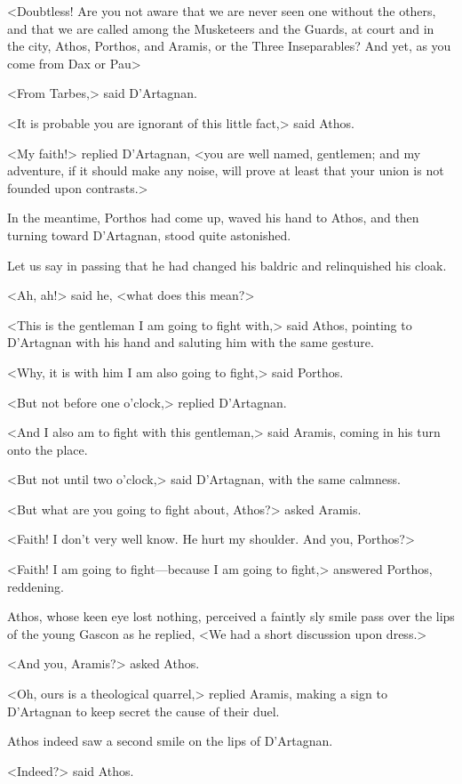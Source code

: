 <Doubtless! Are you not aware that we are never seen one without the others, and that we are called among the Musketeers and the Guards, at court and in the city, Athos, Porthos, and Aramis, or the Three Inseparables? And yet, as you come from Dax or Pau\longdash> 

<From Tarbes,> said D'Artagnan. 

<It is probable you are ignorant of this little fact,> said Athos. 

<My faith!> replied D'Artagnan, <you are well named, gentlemen; and my adventure, if it should make any noise, will prove at least that your union is not founded upon contrasts.> 

In the meantime, Porthos had come up, waved his hand to Athos, and then turning toward D'Artagnan, stood quite astonished. 

Let us say in passing that he had changed his baldric and relinquished his cloak. 

<Ah, ah!> said he, <what does this mean?> 

<This is the gentleman I am going to fight with,> said Athos, pointing to D'Artagnan with his hand and saluting him with the same gesture. 

<Why, it is with him I am also going to fight,> said Porthos. 

<But not before one o'clock,> replied D'Artagnan. 

<And I also am to fight with this gentleman,> said Aramis, coming in his turn onto the place. 

<But not until two o'clock,> said D'Artagnan, with the same calmness. 

<But what are you going to fight about, Athos?> asked Aramis. 

<Faith! I don't very well know. He hurt my shoulder. And you, Porthos?> 

<Faith! I am going to fight—because I am going to fight,> answered Porthos, reddening. 

Athos, whose keen eye lost nothing, perceived a faintly sly smile pass over the lips of the young Gascon as he replied, <We had a short discussion upon dress.> 

<And you, Aramis?> asked Athos. 

<Oh, ours is a theological quarrel,> replied Aramis, making a sign to D'Artagnan to keep secret the cause of their duel. 

Athos indeed saw a second smile on the lips of D'Artagnan. 

<Indeed?> said Athos. 

